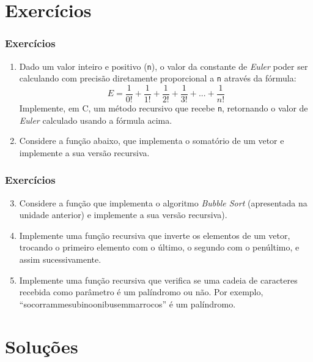 \documentclass[aspectratio=169]{beamer}
\begin{document}
\section{Exercícios}

\begin{frame}\frametitle{Exercícios}
\begin{enumerate}
	\item Dado um valor inteiro e positivo (\texttt{n}), o valor da constante de \emph{Euler} poder ser calculando com precisão diretamente proporcional a \texttt{n} através da fórmula:
\[ E = \frac{1}{0!} + \frac{1}{1!} + \frac{1}{2!}+ \frac{1}{3!} + ... + \frac{1}{n!}\]
Implemente, em C, um método recursivo que recebe \texttt{n}, retornando o valor de \emph{Euler} calculado usando a fórmula acima.
	\item Considere a função abaixo, que implementa o somatório de um vetor e implemente a sua versão recursiva.

\end{enumerate}
\end{frame}

\begin{frame}\frametitle{Exercícios}
\begin{enumerate}
        \setcounter{enumi}{2}
	\item Considere a função que implementa o algoritmo \emph{Bubble Sort} (apresentada na unidade anterior) e implemente a sua versão recursiva).
	\item Implemente uma função recursiva que inverte os elementos de um vetor, trocando o primeiro elemento com o último, o segundo com o penúltimo, e assim sucessivamente.
	\item Implemente uma função recursiva que verifica se uma cadeia de caracteres recebida como parâmetro é um palíndromo ou não. Por exemplo, ``socorrammesubinoonibusemmarrocos'' é um palíndromo.
\end{enumerate}
\end{frame}

\section{Soluções}
\end{document}

